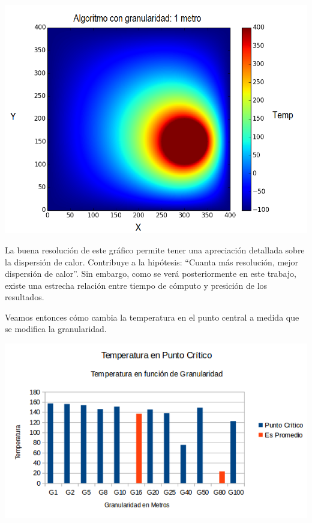 	\begin{center}
		\includegraphics[scale=0.5]{./img/granularidad/g1_t400_sinkill.png}
	\end{center}

	La buena resolución de este gráfico permite tener una apreciación detallada sobre la dispersión de calor. Contribuye a la hipótesis: ``Cuanta más resolución, mejor dispersión de calor''. Sin embargo, como se verá posteriormente en este trabajo, existe una estrecha relación entre tiempo de cómputo y presición de los resultados. 
	
	Veamos entonces cómo cambia la temperatura en el punto central a medida que se modifica la granularidad.


	\begin{center}
		\includegraphics[scale=0.75]{./img/temp_punto_critico/temppuntocritico.png}
	\end{center}

